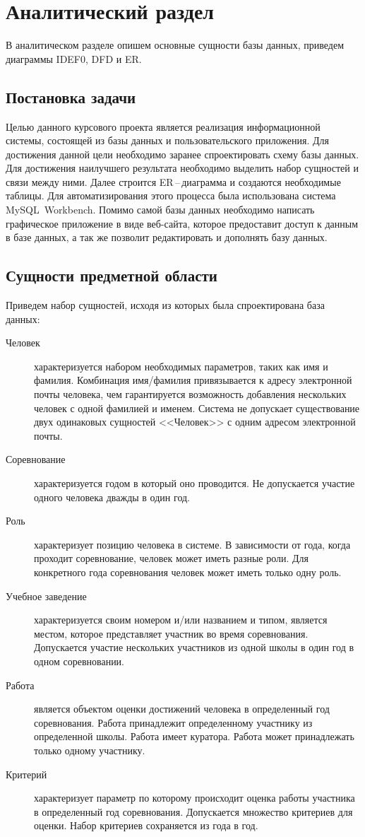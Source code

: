 \section{Аналитический раздел}
В аналитическом разделе опишем основные сущности базы данных, приведем диаграммы
IDEF0, DFD и ER.

\subsection{Постановка задачи}
Целью данного курсового проекта является реализация информационной системы, состоящей из
базы данных и пользовательского приложения. Для достижения данной цели необходимо заранее
спроектировать схему базы данных. Для достижения наилучшего результата необходимо выделить
набор сущностей и связи между ними. Далее строится ER\,--\,диаграмма и создаются необходимые
таблицы. Для автоматизирования этого процесса была использована система MySQL~Workbench.
\newpar
Помимо самой базы данных необходимо написать графическое приложение в виде веб-сайта,
которое предоставит доступ к данным в базе данных, а так же позволит редактировать и дополнять
базу данных.

\subsection{Сущности предметной области}
Приведем набор сущностей, исходя из которых была спроектирована база данных:
\begin{description}
    \item[Человек] характеризуется набором необходимых параметров, таких как имя и
        фамилия. Комбинация имя/фамилия привязывается к адресу электронной почты человека,
        чем гарантируется возможность добавления нескольких человек с одной фамилией и
        именем. Система не допускает существование двух одинаковых сущностей <<Человек>> с
        одним адресом электронной почты.
    \item[Соревнование] характеризуется годом в который оно проводится. Не допускается
        участие одного человека дважды в один год.
    \item[Роль] характеризует позицию человека в системе. В зависимости от года, когда
        проходит соревнование, человек может иметь разные роли. Для конкретного года
        соревнования человек может иметь только одну роль.
    \item[Учебное заведение] характеризуется своим номером и/или названием и типом, является местом,
        которое представляет участник во время соревнования. Допускается участие
        нескольких участников из одной школы в один год в одном соревновании.
    \item[Работа] является объектом оценки достижений человека в определенный год
        соревнования. Работа принадлежит определенному участнику из определенной школы.
        Работа имеет куратора. Работа может принадлежать только одному участнику.
    \item[Критерий] характеризует параметр по которому происходит оценка работы участника в
        определенный год соревнования. Допускается множество критериев для оценки. Набор
        критериев сохраняется из года в год.
\end{description}

